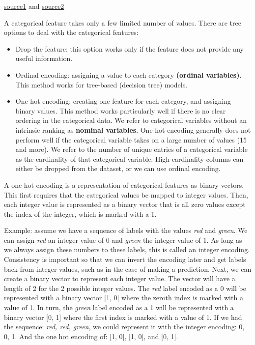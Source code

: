 \documentclass[12pt]{report}
\begin{document}
\href{https://www.youtube.com/watch?v=v_4KWmkwmsU&ab_channel=deeplizard}{source1} and \href{https://machinelearningmastery.com/how-to-one-hot-encode-sequence-data-in-python/}{source2}

A categorical feature takes only a few limited number of values. There are tree options to deal with the categorical features:
\begin{itemize}
  \item Drop the feature: this option works only if the feature does not provide any useful information.
  \item Ordinal encoding: assigning a value to each category \textbf{(ordinal variables)}. This method works for tree-based (decision tree) models.
  \item One-hot encoding: creating one feature for each category, and assigning binary values. This method works particularly well if there is no clear ordering in the categorical data. We refer to categorical variables without an intrinsic ranking as \textbf{nominal variables}. One-hot encoding generally does not perform well if the categorical variable takes on a large number of values (15 and more). We refer to the number of unique entries of a categorical variable as the cardinality of that categorical variable. High cardinality columns can either be dropped from the dataset, or we can use ordinal encoding.
\end{itemize}

A one hot encoding is a representation of categorical features as binary vectors. This first requires that the categorical values be mapped to integer values. Then, each integer value is represented as a binary vector that is all zero values except the index of the integer, which is marked with a 1.

Example: assume we have a sequence of labels with the values \textit{red} and \textit{green}. We can assign \textit{red} an integer value of 0 and \textit{green} the integer value of 1. As long as we always assign these numbers to these labels, this is called an integer encoding. Consistency is important so that we can invert the encoding later and get labels back from integer values, such as in the case of making a prediction. Next, we can create a binary vector to represent each integer value. The vector will have a length of 2 for the 2 possible integer values. The \textit{red} label encoded as a 0 will be represented with a binary vector [1, 0] where the zeroth index is marked with a value of 1. In turn, the \textit{green} label encoded as a 1 will be represented with a binary vector [0, 1] where the first index is marked with a value of 1. If we had the sequence: \textit{red, red, green}, we could represent it with the integer encoding: 0, 0, 1. And the one hot encoding of:
[1, 0], [1, 0], and [0, 1].
\end{document}
